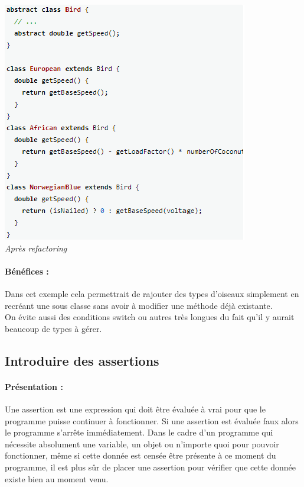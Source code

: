 \documentclass[a4paper,twoside,12pt,openright]{report}
\begin{document}
\begin{center}
\includegraphics[scale=1]{Image/ReplaceConditionalPoly2.png}\\
\itshape{Après refactoring \cite{ref5}}
\end{center}

\paragraph{Bénéfices :}
Dans cet exemple cela permettrait de rajouter des types d'oiseaux simplement en recréant une sous classe sans avoir à modifier une méthode déjà existante.\\
On évite aussi des conditions switch ou autres très longues du fait qu'il y aurait beaucoup de types à gérer.\\

\newpage

\subsection{Introduire des assertions}
\paragraph{Présentation :}
Une assertion est une expression qui doit être évaluée à vrai pour que le programme puisse continuer à fonctionner. Si une assertion est évaluée faux alors le programme s'arrête immédiatement.
Dans le cadre d'un programme qui nécessite absolument une variable, un objet ou n'importe quoi pour pouvoir fonctionner, même si cette donnée est censée être présente à ce moment du programme, il est plus sûr de placer une assertion pour vérifier que cette donnée existe bien au moment venu.
\end{document}
